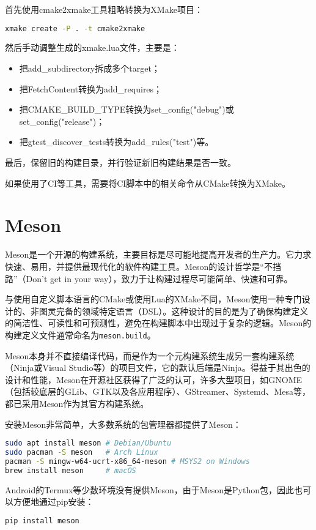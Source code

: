 \documentclass[../main.tex]{subfiles}
\begin{document}
首先使用cmake2xmake工具粗略转换为XMake项目：
\begin{lstlisting}[language=bash]
    xmake create -P . -t cmake2xmake
\end{lstlisting}
然后手动调整生成的xmake.lua文件，主要是：
\begin{itemize}
    \item 把add\_subdirectory拆成多个target；
    \item 把FetchContent转换为add\_requires；
    \item 把CMAKE\_BUILD\_TYPE转换为set\_config("debug")或set\_config("release")；
    \item 把gtest\_discover\_tests转换为add\_rules("test")等。
\end{itemize}
最后，保留旧的构建目录，并行验证新旧构建结果是否一致。

如果使用了CI等工具，需要将CI脚本中的相关命令从CMake转换为XMake。

\section{Meson}

Meson是一个开源的构建系统，主要目标是尽可能地提高开发者的生产力。它力求快速、易用，并提供最现代化的软件构建工具。Meson的设计哲学是“不挡路”（Don't get in your way），致力于让构建过程尽可能简单、快速和可靠。

与使用自定义脚本语言的CMake或使用Lua的XMake不同，Meson使用一种专门设计的、非图灵完备的领域特定语言（DSL）。这种设计的目的是为了确保构建定义的简洁性、可读性和可预测性，避免在构建脚本中出现过于复杂的逻辑。Meson的构建定义文件通常命名为\texttt{meson.build}。

Meson本身并不直接编译代码，而是作为一个元构建系统生成另一套构建系统（Ninja或Visual Studio等）的项目文件，它的默认后端是Ninja。得益于其出色的设计和性能，Meson在开源社区获得了广泛的认可，许多大型项目，如GNOME（包括较底层的GLib、GTK以及各应用程序）、GStreamer、Systemd、Mesa等，都已采用Meson作为其官方构建系统。

安装Meson非常简单，大多数系统的包管理器都提供了Meson：
\begin{lstlisting}[language=bash]
sudo apt install meson # Debian/Ubuntu
sudo pacman -S meson   # Arch Linux
pacman -S mingw-w64-ucrt-x86_64-meson # MSYS2 on Windows
brew install meson     # macOS
\end{lstlisting}

Android的Termux等少数环境没有提供Meson，由于Meson是Python包，因此也可以方便地通过pip安装：
\begin{lstlisting}[language=bash]
pip install meson
\end{lstlisting}
\end{document}
